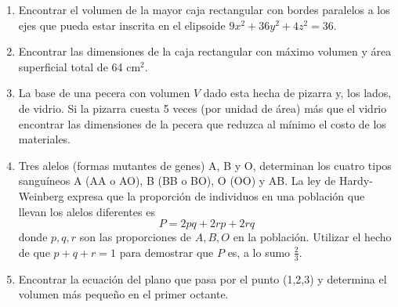 \documentclass[fleqn, 12pt]{article}
\begin{document}
\begin{enumerate}
        \item Encontrar el volumen de la mayor caja rectangular con bordes paralelos a los ejes que pueda estar inscrita en el elipsoide $ 9x^2 + 36y^2 + 4z^2 = 36 $.
        

        \item Encontrar las dimensiones de la caja rectangular con máximo volumen y área superficial total de 64 cm$ ^2 $.
        

        \item La base de una pecera con volumen $ V $ dado esta hecha de pizarra y, los lados, de vidrio. Si la pizarra cuesta 5 veces (por unidad de área) más que el vidrio encontrar las dimensiones de la pecera que reduzca al mínimo el costo de los materiales.
        

        \item Tres alelos (formas mutantes de genes) A, B y O, determinan los cuatro tipos sanguíneos A (AA o AO), B (BB o BO), O (OO) y AB. La ley de Hardy-Weinberg expresa que la proporción de individuos en una población que llevan los alelos diferentes es
        $$ P = 2pq + 2rp + 2rq $$
        donde $ p, q, r $ son las proporciones de $ A, B, O $ en la población. Utilizar el hecho de que $ p + q + r = 1 $ para demostrar que $ P $ es, a lo sumo $ \frac{2}{3} $.


        \item Encontrar la ecuación del plano que pasa por el punto (1,2,3) y determina el volumen más pequeño en el primer octante.
        
    \end{enumerate}
\end{document}
